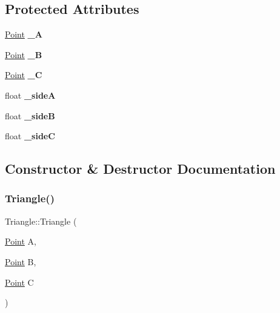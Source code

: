 \subsection*{Protected Attributes}
\begin{DoxyCompactItemize}
\item 
\mbox{\label{class_triangle_a76e5a97fcdfdabaf16c53dce3e975dd2}} 
\mbox{\hyperlink{class_point}{Point}} {\bfseries \+\_\+A}
\item 
\mbox{\label{class_triangle_a03ac8fa7ab102f088fdee42e830e821b}} 
\mbox{\hyperlink{class_point}{Point}} {\bfseries \+\_\+B}
\item 
\mbox{\label{class_triangle_a216d555d6342ee27c36258e8c9aa6c52}} 
\mbox{\hyperlink{class_point}{Point}} {\bfseries \+\_\+C}
\item 
\mbox{\label{class_triangle_a556ba0c1784024bb3b44f950235f1d1f}} 
float {\bfseries \+\_\+sideA}
\item 
\mbox{\label{class_triangle_ad1f59d1c17978bf49106872fec377bed}} 
float {\bfseries \+\_\+sideB}
\item 
\mbox{\label{class_triangle_a97f48eff98e5d40ea60d6b19d103dcd0}} 
float {\bfseries \+\_\+sideC}
\end{DoxyCompactItemize}


\subsection{Constructor \& Destructor Documentation}
\mbox{\label{class_triangle_ae015b2eea88192163bb6e7cd93a81a35}} 
\subsubsection{\texorpdfstring{Triangle()}{Triangle()}}
{\footnotesize\ttfamily Triangle\+::\+Triangle (\begin{DoxyParamCaption}\item[{\mbox{\hyperlink{class_point}{Point}}}]{A,  }\item[{\mbox{\hyperlink{class_point}{Point}}}]{B,  }\item[{\mbox{\hyperlink{class_point}{Point}}}]{C }\end{DoxyParamCaption})}


